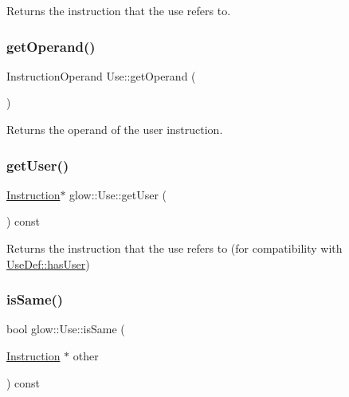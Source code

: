 \begin{DoxyReturn}{Returns}
the instruction that the use refers to. 
\end{DoxyReturn}
\mbox{\label{structglow_1_1_use_ade9da8a3f564786ec28fdca26044d07c}} 
\subsubsection{\texorpdfstring{get\+Operand()}{getOperand()}}
{\footnotesize\ttfamily Instruction\+Operand Use\+::get\+Operand (\begin{DoxyParamCaption}{ }\end{DoxyParamCaption})}

\begin{DoxyReturn}{Returns}
the operand of the user instruction. 
\end{DoxyReturn}
\mbox{\label{structglow_1_1_use_a2625c7dfb47805d15247b041f787fa01}} 
\subsubsection{\texorpdfstring{get\+User()}{getUser()}}
{\footnotesize\ttfamily \hyperlink{classglow_1_1_instruction}{Instruction}$\ast$ glow\+::\+Use\+::get\+User (\begin{DoxyParamCaption}{ }\end{DoxyParamCaption}) const\hspace{0.3cm}{\ttfamily [inline]}}

\begin{DoxyReturn}{Returns}
the instruction that the use refers to (for compatibility with \hyperlink{classglow_1_1_use_def_a9b0a173f02a51a77ce3e9e342ae416c9}{Use\+Def\+::has\+User}) 
\end{DoxyReturn}
\mbox{\label{structglow_1_1_use_aa6d1ae2ad6ba793289f0df77fbe31ef4}} 
\subsubsection{\texorpdfstring{is\+Same()}{isSame()}}
{\footnotesize\ttfamily bool glow\+::\+Use\+::is\+Same (\begin{DoxyParamCaption}\item[{\hyperlink{classglow_1_1_instruction}{Instruction} $\ast$}]{other }\end{DoxyParamCaption}) const\hspace{0.3cm}{\ttfamily [inline]}}

